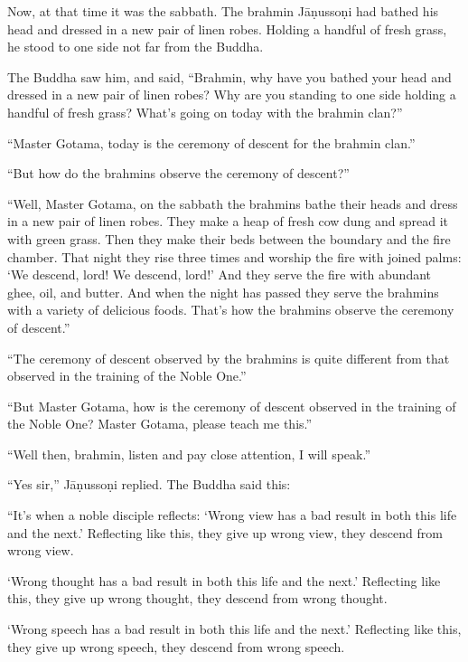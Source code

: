 \documentclass[12pt,openany]{book}%
\begin{document}
Now, at that time it was the sabbath. The brahmin \textsanskrit{Jāṇussoṇi} had bathed his head and dressed in a new pair of linen robes. Holding a handful of fresh grass, he stood to one side not far from the Buddha. 

The Buddha saw him, and said, “Brahmin, why have you bathed your head and dressed in a new pair of linen robes? Why are you standing to one side holding a handful of fresh grass? What’s going on today with the brahmin clan?” 

“Master Gotama, today is the ceremony of descent for the brahmin clan.” 

“But how do the brahmins observe the ceremony of descent?” 

“Well, Master Gotama, on the sabbath the brahmins bathe their heads and dress in a new pair of linen robes. They make a heap of fresh cow dung and spread it with green grass. Then they make their beds between the boundary and the fire chamber. That night they rise three times and worship the fire with joined palms: ‘We descend, lord! We descend, lord!’ And they serve the fire with abundant ghee, oil, and butter. And when the night has passed they serve the brahmins with a variety of delicious foods. That’s how the brahmins observe the ceremony of descent.” 

“The ceremony of descent observed by the brahmins is quite different from that observed in the training of the Noble One.” 

“But Master Gotama, how is the ceremony of descent observed in the training of the Noble One? Master Gotama, please teach me this.” 

“Well then, brahmin, listen and pay close attention, I will speak.” 

“Yes sir,” \textsanskrit{Jāṇussoṇi} replied. The Buddha said this: 

“It’s when a noble disciple reflects: ‘Wrong view has a bad result in both this life and the next.’ Reflecting like this, they give up wrong view, they descend from wrong view. 

‘Wrong thought has a bad result in both this life and the next.’ Reflecting like this, they give up wrong thought, they descend from wrong thought. 

‘Wrong speech has a bad result in both this life and the next.’ Reflecting like this, they give up wrong speech, they descend from wrong speech. 
\end{document}
